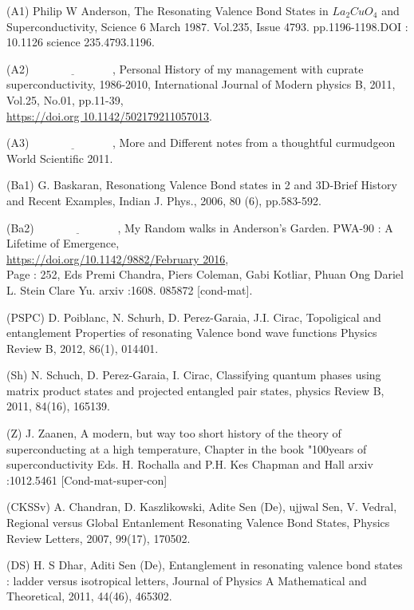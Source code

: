 \documentclass[a4paper,12pt]{article}
\theoremstyle{definition}
\theoremstyle{underlinethm}
\theoremstyle{definition}
\begin{document}
\begin{thebibliography}{99}
\bibitem{} (A1) Philip W Anderson, The Resonating Valence Bond States in $La_{2}CuO_{4}$ and Superconductivity, Science 6 March 1987. Vol.235, Issue 4793. pp.1196-1198.DOI : 10.1126 science 235.4793.1196.

\bibitem{} (A2) $\underline{\hspace{3cm}}$, Personal History of my management with cuprate superconductivity, 1986-2010, International Journal of Modern physics B, 2011, Vol.25, No.01, pp.11-39,\\ \url{https://doi.org 10.1142/502179211057013}.

\bibitem{} (A3) $\underline{\hspace{3cm}}$, More and Different notes from a thoughtful curmudgeon World Scientific 2011.

\bibitem{} (Ba1) G. Baskaran, Resonationg Valence Bond states in 2 and 3D-Brief History and Recent Examples, Indian J. Phys., 2006, 80 (6), pp.583-592.

\bibitem{} (Ba2) $\underline{\hspace{3cm}}$, My Random walks in Anderson's Garden. PWA-90 : A Lifetime of Emergence,\\ 
\url{https://doi.org/10.1142/9882/February 2016},\\ 
Page : 252, Eds Premi Chandra, Piers Coleman, Gabi Kotliar, Phuan Ong Dariel L. Stein Clare Yu. arxiv :1608. 085872 [cond-mat].

\bibitem{} (PSPC) D. Poiblanc, N. Schurh, D. Perez-Garaia, J.I. Cirac, Topoligical and entanglement Properties of resonating Valence bond wave functions Physics Review B, 2012, 86(1), 014401.

\bibitem{} (Sh) N. Schuch, D. Perez-Garaia, I. Cirac, Classifying quantum phases using matrix product states and projected entangled pair states, physics Review B, 2011, 84(16), 165139.

\bibitem{} (Z) J. Zaanen, A modern, but way too short history of the theory of superconducting at a high temperature, Chapter in the book "100years of superconductivity Eds. H. Rochalla and P.H. Kes Chapman and Hall arxiv :1012.5461 [Cond-mat-super-con]

\bibitem{} (CKSSv) A. Chandran, D. Kaszlikowski, Adite Sen (De), ujjwal Sen, V. Vedral, Regional versus Global Entanlement Resonating Valence Bond States, Physics Review Letters, 2007, 99(17), 170502.

\bibitem{} (DS) H. S Dhar, Aditi Sen (De), Entanglement in resonating valence bond states : ladder versus isotropical letters, Journal of Physics A Mathematical and Theoretical, 2011, 44(46), 465302.


\end{thebibliography}
\end{document}
